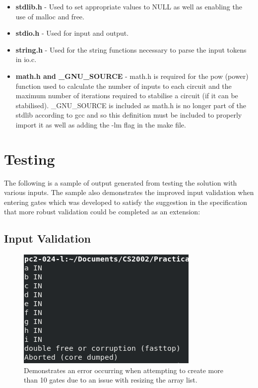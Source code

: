 \documentclass[11]{article}
\begin{document}
\begin{itemize}
					\item \textbf{stdlib.h} - Used to set appropriate values to NULL as well as enabling the use of malloc and free.
					
					\item \textbf{stdio.h} - Used for input and output.
					
					\item \textbf{string.h} - Used for the string functions necessary to parse the input tokens in io.c.
					\item \textbf{math.h and \_GNU\_SOURCE} - math.h is required for the pow (power) function used to calculate the number of inputs to each circuit and the maximum number of iterations required to stabilise a circuit (if it can be stabilised). \_GNU\_SOURCE is included as math.h is no longer part of the stdlib according to gcc and so this definition must be included to properly import it as well as adding the -lm flag in the make file.
					
	\end{itemize}
	\section{Testing}
		The following is a sample of output generated from testing the solution with various inputs. The sample also demonstrates the improved input validation when entering gates which was developed to satisfy the suggestion in the specification that more robust validation could be completed as an extension:
			\subsection{Input Validation}
				\begin{figure}[h!]
				
					\caption{Demonstrates an error occurring when attempting to create more than 10 gates due to an issue with resizing the array list.}
					\centering
					\includegraphics[scale=0.5]{ArrayListResizeError.png}
				\end{figure}
				
\end{document}
